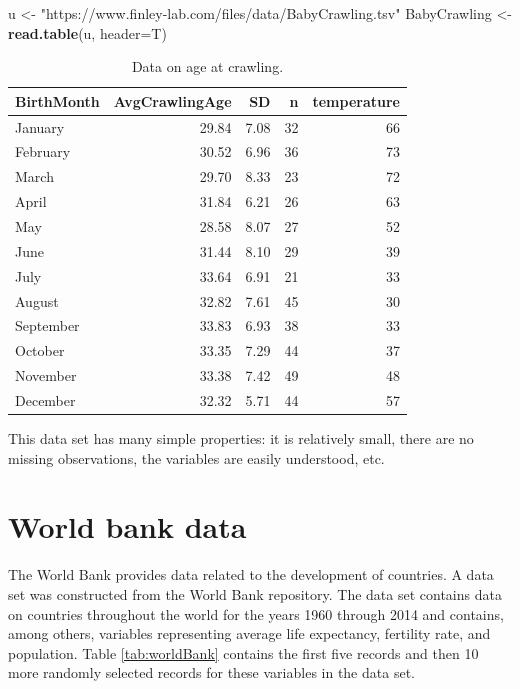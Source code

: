 \documentclass[
]{krantz}
\newenvironment{Shaded}{\begin{snugshade}}{\end{snugshade}}
\newcommand{\DataTypeTok}[1]{\textcolor[rgb]{0.13,0.29,0.53}{#1}}
\newcommand{\KeywordTok}[1]{\textcolor[rgb]{0.13,0.29,0.53}{\textbf{#1}}}
\newcommand{\NormalTok}[1]{#1}
\newcommand{\StringTok}[1]{\textcolor[rgb]{0.31,0.60,0.02}{#1}}
\begin{document}
\begin{Shaded}
\begin{Highlighting}[]
\NormalTok{u \textless{}{-}}\StringTok{ "https://www.finley{-}lab.com/files/data/BabyCrawling.tsv"}
\NormalTok{BabyCrawling \textless{}{-}}\StringTok{ }\KeywordTok{read.table}\NormalTok{(u, }\DataTypeTok{header=}\NormalTok{T)}
\end{Highlighting}
\end{Shaded}

\begin{table}

\caption{\label{tab:crawling}Data on age at crawling.}
\centering
\begin{tabular}[t]{lrrrr}
\toprule
BirthMonth & AvgCrawlingAge & SD & n & temperature\\
\midrule
January & 29.84 & 7.08 & 32 & 66\\
February & 30.52 & 6.96 & 36 & 73\\
March & 29.70 & 8.33 & 23 & 72\\
April & 31.84 & 6.21 & 26 & 63\\
May & 28.58 & 8.07 & 27 & 52\\
\addlinespace
June & 31.44 & 8.10 & 29 & 39\\
July & 33.64 & 6.91 & 21 & 33\\
August & 32.82 & 7.61 & 45 & 30\\
September & 33.83 & 6.93 & 38 & 33\\
October & 33.35 & 7.29 & 44 & 37\\
\addlinespace
November & 33.38 & 7.42 & 49 & 48\\
December & 32.32 & 5.71 & 44 & 57\\
\bottomrule
\end{tabular}
\end{table}

This data set has many simple properties: it is relatively small, there are no missing observations, the variables are easily understood, etc.

\hypertarget{world-bank-data}{%
\section{World bank data}\label{world-bank-data}}

The World Bank provides data related to the development of countries. A data set was constructed from the World Bank repository. The data set contains data on countries throughout the world for the years 1960 through 2014 and contains, among others, variables representing average life expectancy, fertility rate, and population. Table \ref{tab:worldBank} contains the first five records and then 10 more randomly selected records for these variables in the data set.
\end{document}
